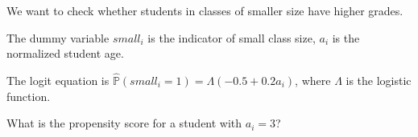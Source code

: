 
\begin{question}
We want to check whether students in classes of smaller size have higher grades.

The dummy variable \(small_i\) is the indicator of small class size, \(a_i\) is the normalized student age.

The logit equation is \(\hat{\mathbb{P}}(small_i = 1) = \Lambda(-0.5 + 0.2 a_i)\), where \(\Lambda\) is the logistic function.

What is the propensity score for a student with \(a_i = 3\)?
\end{question}


